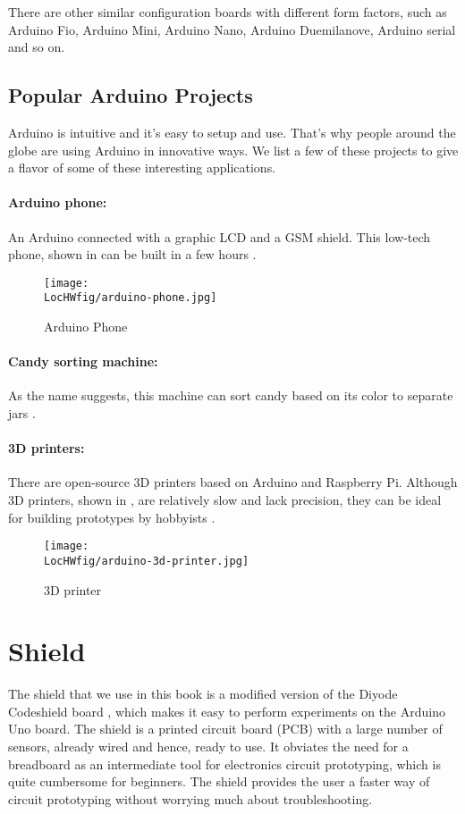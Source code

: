 There are other similar configuration boards with different form
factors, such as Arduino Fio, Arduino Mini, Arduino Nano, Arduino
Duemilanove, Arduino serial and so on.

\subsection{Popular Arduino Projects}
Arduino is intuitive and it's easy to setup and use. That's why people around the globe 
are using Arduino in innovative ways. We list a few of these projects to give a 
flavor of some of these interesting applications.

\paragraph{Arduino phone:} An Arduino connected with a graphic LCD and a
GSM shield. This low-tech phone, shown in  can
be built in a few hours \cite{phone-ref}.  
\begin{figure}
  \centering
  \texttt{[image: \\LocHWfig/arduino-phone.jpg]}
  \caption{Arduino Phone}
  \label{arduino-phone}
\end{figure}

\paragraph{Candy sorting machine:} As the name suggests, this machine 
can sort candy based on its color to separate jars \cite{candy-ref}.

\paragraph{3D printers:} There are open-source 3D printers based on
Arduino and  Raspberry Pi. Although 3D printers, shown in ,
 are relatively slow and lack precision, they can be ideal for building prototypes by
hobbyists \cite{3d-printer-ref}.
\begin{figure}
  \centering
  \texttt{[image: \\LocHWfig/arduino-3d-printer.jpg]}
  \caption{3D printer}
  \label{3dprinter}
\end{figure}

\section{Shield}
The shield that we use in this book is a modified version of the Diyode Codeshield 
board \cite{shield-ref}, which makes it easy to perform
experiments on the Arduino Uno board.  The shield is a printed circuit
board (PCB) with a large number of sensors, already wired and hence,
ready to use.  It obviates the need for a breadboard as an
intermediate tool for electronics circuit prototyping, which is quite
cumbersome for beginners.  The shield provides the user a faster way
of circuit prototyping without worrying much about troubleshooting.


